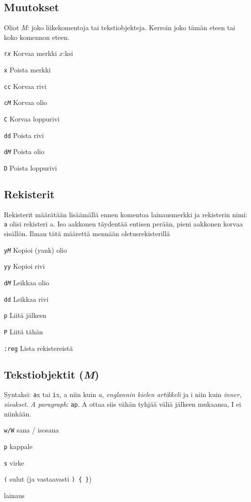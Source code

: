 \documentclass{article}
\newcommand{\com}[1]{{\large{\texttt{#1}}}}
\newcommand{\Com}[1]{\com{#1}  }
\newcommand{\M}{{\large{\textit{M}}}}
\begin{document}
\begin{multicols}{4}
\subsection*{Muutokset}
Oliot \M: joko liikekomentoja tai tekstiobjekteja. Kerroin joko tämän eteen tai koko komennon eteen.
\begin{description}
\item{\Com{r\emph{x}}} Korvaa merkki $x$:ksi
\item{\Com{x}} Poista merkki
\item{\Com{cc}}  Korvaa rivi 
\item{\Com{c\M}}  Korvaa olio 
\item{\Com{C}} Korvaa loppurivi
\item{\Com{dd}}  Poista rivi 
\item{\Com{d\M}}  Poista olio 
\item{\Com{D}} Poista loppurivi
\end{description}

\subsection*{Rekisterit}
Rekisterit määrätään lisäämällä ennen komentoa lainausmerkki ja  rekisterin nimi: \com{\textquotedbl a} olisi rekisteri a. Iso aakkonen täydentää entisen perään, pieni aakkonen korvaa sisällön. Ilman tätä määrettä mennään oletusrekisterillä \com{}
\begin{description}
\item{\Com{y\M}} Kopioi (yank) olio
\item{\Com{yy}} Kopioi rivi
\item{\Com{d\M}} Leikkaa olio
\item{\Com{dd}} Leikkaa rivi
\item{\Com{p}} Liitä jälkeen
\item{\Com{P}} Liitä tähän
\item{\Com{:reg}} Lista rekistereistä
\end{description}

\subsection*{Tekstiobjektit (\M)}
Syntaksi: \com{a}x tai \com{i}x, a niin kuin \emph{a, englannin kielen artikkeli} ja i niin kuin \emph{inner, sisukset}. \emph{A paragraph}: \com{ap}. A ottaa siis vähän tyhjää väliä jälkeen mukaansa, I ei niinkään.

\begin{description}
\item{\Com{w/W}}  sana / isosana
\item{\Com{p}}  kappale 
\item{\Com{s}}  virke 
\item{\Com{(}}  sulut  (ja vastaavasti \com{) \{ \}})
\item{\Com{\textquotedbl}}  lainaus
\end{description}


\end{multicols}
\end{document}
